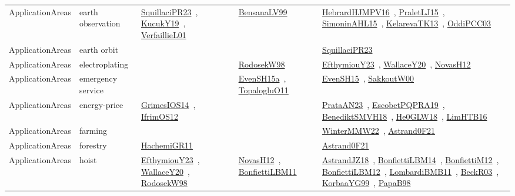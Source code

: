 {\begin{longtable}{lp{3cm}>{\raggedright\arraybackslash}p{6cm}>{\raggedright\arraybackslash}p{6cm}>{\raggedright\arraybackslash}p{8cm}}
ApplicationAreas & earth observation & \href{works/SquillaciPR23.pdf}{SquillaciPR23}~\cite{SquillaciPR23}, \href{works/KucukY19.pdf}{KucukY19}~\cite{KucukY19}, \href{works/VerfaillieL01.pdf}{VerfaillieL01}~\cite{VerfaillieL01} & \href{works/BensanaLV99.pdf}{BensanaLV99}~\cite{BensanaLV99} & \href{works/HebrardHJMPV16.pdf}{HebrardHJMPV16}~\cite{HebrardHJMPV16}, \href{works/PraletLJ15.pdf}{PraletLJ15}~\cite{PraletLJ15}, \href{works/SimoninAHL15.pdf}{SimoninAHL15}~\cite{SimoninAHL15}, \href{works/KelarevaTK13.pdf}{KelarevaTK13}~\cite{KelarevaTK13}, \href{works/OddiPCC03.pdf}{OddiPCC03}~\cite{OddiPCC03}\\
ApplicationAreas & earth orbit &  &  & \href{works/SquillaciPR23.pdf}{SquillaciPR23}~\cite{SquillaciPR23}\\
ApplicationAreas & electroplating &  & \href{works/RodosekW98.pdf}{RodosekW98}~\cite{RodosekW98} & \href{works/EfthymiouY23.pdf}{EfthymiouY23}~\cite{EfthymiouY23}, \href{works/WallaceY20.pdf}{WallaceY20}~\cite{WallaceY20}, \href{works/NovasH12.pdf}{NovasH12}~\cite{NovasH12}\\
ApplicationAreas & emergency service &  & \href{works/EvenSH15a.pdf}{EvenSH15a}~\cite{EvenSH15a}, \href{works/TopalogluO11.pdf}{TopalogluO11}~\cite{TopalogluO11} & \href{works/EvenSH15.pdf}{EvenSH15}~\cite{EvenSH15}, \href{works/SakkoutW00.pdf}{SakkoutW00}~\cite{SakkoutW00}\\
ApplicationAreas & energy-price & \href{works/GrimesIOS14.pdf}{GrimesIOS14}~\cite{GrimesIOS14}, \href{works/IfrimOS12.pdf}{IfrimOS12}~\cite{IfrimOS12} &  & \href{works/PrataAN23.pdf}{PrataAN23}~\cite{PrataAN23}, \href{works/EscobetPQPRA19.pdf}{EscobetPQPRA19}~\cite{EscobetPQPRA19}, \href{works/BenediktSMVH18.pdf}{BenediktSMVH18}~\cite{BenediktSMVH18}, \href{works/He0GLW18.pdf}{He0GLW18}~\cite{He0GLW18}, \href{works/LimHTB16.pdf}{LimHTB16}~\cite{LimHTB16}\\
ApplicationAreas & farming &  &  & \href{works/WinterMMW22.pdf}{WinterMMW22}~\cite{WinterMMW22}, \href{works/Astrand0F21.pdf}{Astrand0F21}~\cite{Astrand0F21}\\
ApplicationAreas & forestry & \href{works/HachemiGR11.pdf}{HachemiGR11}~\cite{HachemiGR11} &  & \href{works/Astrand0F21.pdf}{Astrand0F21}~\cite{Astrand0F21}\\
ApplicationAreas & hoist & \href{works/EfthymiouY23.pdf}{EfthymiouY23}~\cite{EfthymiouY23}, \href{works/WallaceY20.pdf}{WallaceY20}~\cite{WallaceY20}, \href{works/RodosekW98.pdf}{RodosekW98}~\cite{RodosekW98} & \href{works/NovasH12.pdf}{NovasH12}~\cite{NovasH12}, \href{works/BonfiettiLBM11.pdf}{BonfiettiLBM11}~\cite{BonfiettiLBM11} & \href{works/AstrandJZ18.pdf}{AstrandJZ18}~\cite{AstrandJZ18}, \href{works/BonfiettiLBM14.pdf}{BonfiettiLBM14}~\cite{BonfiettiLBM14}, \href{works/BonfiettiM12.pdf}{BonfiettiM12}~\cite{BonfiettiM12}, \href{works/BonfiettiLBM12.pdf}{BonfiettiLBM12}~\cite{BonfiettiLBM12}, \href{works/LombardiBMB11.pdf}{LombardiBMB11}~\cite{LombardiBMB11}, \href{works/BeckR03.pdf}{BeckR03}~\cite{BeckR03}, \href{works/KorbaaYG99.pdf}{KorbaaYG99}~\cite{KorbaaYG99}, \href{works/PapaB98.pdf}{PapaB98}~\cite{PapaB98}\\

\end{longtable}}
